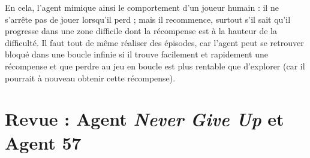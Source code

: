 \documentclass[a4paper,12pt]{report}
\begin{document}
\newline En cela, l'agent mimique ainsi le comportement d'un joueur humain : il ne s'arrête pas de jouer lorsqu’il perd ; mais il recommence, surtout s’il sait qu’il progresse dans une zone difficile dont la récompense est à la hauteur de la difficulté.
\newline Il faut tout de même réaliser des épisodes, car l’agent peut se retrouver bloqué dans une boucle infinie si il trouve facilement et rapidement une récompense et que perdre au jeu en boucle est plus rentable que d'explorer (car il pourrait à nouveau obtenir cette récompense).

\newpage \section{Revue : Agent \textit{Never Give Up} et Agent 57}
\end{document}
